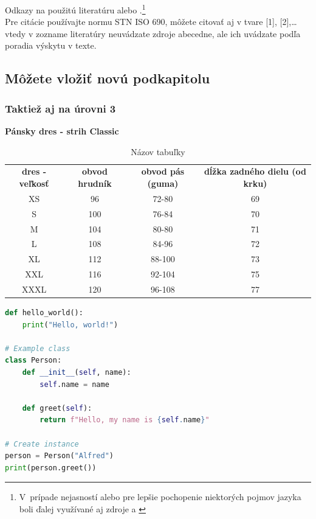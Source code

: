 \newpage
\noindent
Odkazy na použitú literatúru \parencite{luptak2016thesis} alebo \textcite{borgman2003from}.\footnote{V prípade nejasností alebo pre lepšie pochopenie niektorých pojmov jazyka boli ďalej využívané aj zdroje \parencite{lynch2005where} a \parencite{luptak2016thesis}}
\\Pre citácie používajte normu STN ISO 690, môžete citovať aj v tvare [1], [2],… vtedy v zozname literatúry neuvádzate zdroje abecedne, ale ich uvádzate podľa poradia výskytu v texte. 

\subsection{Môžete vložiť novú podkapitolu}
\subsubsection{Taktiež aj na úrovni 3}

\begin{table}[!h]
    \centering
    \caption{Názov tabuľky}
    {\color{red} \textbf{Pánsky dres - strih Classic}}\\
    \vspace{1em}
    \begin{tabular}{cccc}  
        \textbf{dres - veľkosť} & \textbf{obvod hrudník} & \textbf{obvod pás (guma)} & \textbf{dĺžka zadného dielu (od krku)} \\
        XS & 96 & 72-80 & 69 \\
        S & 100 & 76-84 & 70 \\
        M & 104 & 80-80 & 71 \\
        L & 108 & 84-96 & 72 \\
        XL & 112 & 88-100 & 73 \\
        XXL & 116 & 92-104 & 75 \\
        XXXL & 120 & 96-108 & 77 \\
    \end{tabular}
    \label{tab:example}
\end{table}

\begin{lstlisting}[language=Python, caption={Príklad kódu v Pythone}, label={lst:python-example}]    
def hello_world():
    print("Hello, world!")
        
# Example class
class Person:
    def __init__(self, name):
        self.name = name
    
    def greet(self):
        return f"Hello, my name is {self.name}"

# Create instance
person = Person("Alfred")
print(person.greet())
\end{lstlisting}
